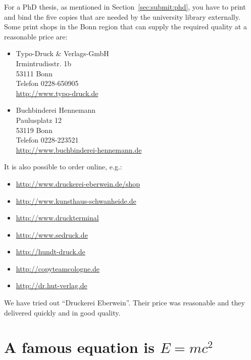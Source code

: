For a PhD thesis, as mentioned in Section~\ref{sec:submit:phd}, you
have to print and bind the five copies that are needed by the
university library externally. Some print shops in the Bonn region
that can supply the required quality at a reasonable price are:

\begin{itemize}
\item
Typo-Druck \& Verlags-GmbH\\
Irmintrudisstr. 1b\\
53111 Bonn\\
Telefon 0228-650905\\
\url{http://www.typo-druck.de}

\item
Buchbinderei Hennemann\\
Paulusplatz 12\\
53119 Bonn\\
Telefon 0228-223521\\
\url{http://www.buchbinderei-hennemann.de}

\end{itemize}

It is also possible to order online, e.g.:
\begin{itemize}
\item \url{http://www.druckerei-eberwein.de/shop}
\item \url{http://www.kunsthaus-schwanheide.de}
\item \url{http://www.druckterminal}
\item \url{http://www.sedruck.de}
\item \url{http://hundt-druck.de}
\item \url{http://copyteamcologne.de}
\item \url{http://dr.hut-verlag.de}
\end{itemize}
We have tried out \foreignquote{ngerman}{Druckerei Eberwein}. Their
price was reasonable and they delivered quickly and in good quality.

\chapter{A famous equation is \boldmath$E = mc^{2}$}
\label{sec:emc2}

